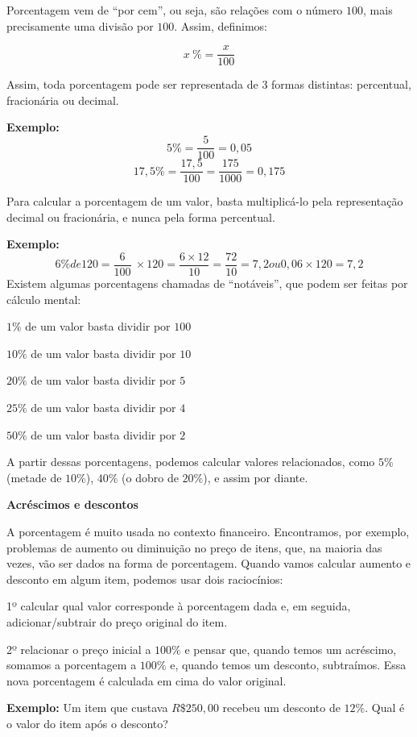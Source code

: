 Porcentagem vem de ``por cem'', ou seja, são relações com o número $100$,
mais precisamente uma divisão por $100$. Assim, definimos:

$$x\ \% = \frac{x}{100}$$

Assim, toda porcentagem pode ser representada de 3 formas distintas:
percentual, fracionária ou decimal.

\textbf{Exemplo:} 
$$5\% = \frac{5}{100} = 0,05$$
 $$17,5\% = \frac{17,5}{100} = \frac{175}{1000} = 0,175$$

Para calcular a porcentagem de um valor, basta multiplicá-lo pela
representação decimal ou fracionária, e nunca pela forma percentual.

\textbf{Exemplo:}
$$6\% de 120 = \frac{6}{100}\  \times 120 = \frac{6 \times 12}{10} = \frac{72}{10} = 7,2 ou 0,06 \times 120 = 7,2$$
Existem algumas porcentagens chamadas de ``notáveis'', que podem ser
feitas por cálculo mental:

$1\%$ de um valor \rightarrow basta dividir por $100$

$10\%$ de um valor \rightarrow basta dividir por $10$

$20\%$ de um valor \rightarrow basta dividir por $5$

$25\%$ de um valor \rightarrow basta dividir por $4$

$50\%$ de um valor \rightarrow basta dividir por $2$

A partir dessas porcentagens, podemos calcular valores relacionados,
como $5\%$ (metade de $10\%$), $40\%$ (o dobro de $20\%$), e assim por diante.

\textbf{Acréscimos e descontos}

A porcentagem é muito usada no contexto financeiro. Encontramos, por
exemplo, problemas de aumento ou diminuição no preço de itens, que, na
maioria das vezes, vão ser dados na forma de porcentagem. Quando vamos
calcular aumento e desconto em algum item, podemos usar dois
raciocínios:

1º \rightarrow calcular qual valor corresponde à porcentagem dada e,
em seguida, adicionar/subtrair do preço original do item.

2º \rightarrow relacionar o preço inicial a $100\%$ e pensar que,
quando temos um acréscimo, somamos a porcentagem a $100\%$ e, quando temos
um desconto, subtraímos. Essa nova porcentagem é calculada em cima do
valor original.

\textbf{Exemplo:} Um item que custava $R\$250,00$ recebeu um desconto de
$12\%$. Qual é o valor do item após o desconto?

